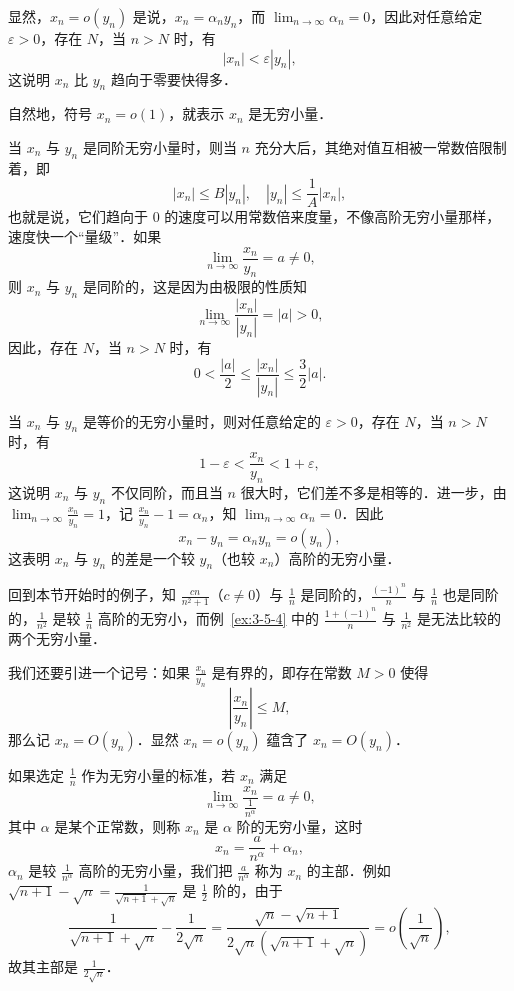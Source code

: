 显然，$x_n = o(y_n)$ 是说，$x_n = \alpha_n y_n$，而 $\lim_{n \to \infty} \alpha_n = 0$，因此对任意给定 $\varepsilon > 0$，存在 $N$，当 $n > N$ 时，有
\[
|x_n| < \varepsilon |y_n|,
\]
这说明 $x_n$ 比 $y_n$ 趋向于零要快得多．

自然地，符号 $x_n = o(1)$，就表示 $x_n$ 是无穷小量．

当 $x_n$ 与 $y_n$ 是同阶无穷小量时，则当 $n$ 充分大后，其绝对值互相被一常数倍限制着，即
\[
|x_n| \leqslant B|y_n|, \quad |y_n| \leqslant \frac{1}{A}|x_n|,
\]
也就是说，它们趋向于 $0$ 的速度可以用常数倍来度量，不像高阶无穷小量那样，速度快一个``量级''．如果
\[
\lim_{n \to \infty} \frac{x_n}{y_n} = a \neq 0,
\]
则 $x_n$ 与 $y_n$ 是同阶的，这是因为由极限的性质知
\[
\lim_{n \to \infty} \frac{|x_n|}{|y_n|} = |a| > 0,
\]
因此，存在 $N$，当 $n > N$ 时，有
\[
0 < \frac{|a|}{2} \leqslant \frac{|x_n|}{|y_n|} \leqslant \frac{3}{2}|a|.
\]

当 $x_n$ 与 $y_n$ 是等价的无穷小量时，则对任意给定的 $\varepsilon > 0$，存在 $N$，当 $n > N$ 时，有
\[
1 - \varepsilon < \frac{x_n}{y_n} < 1 + \varepsilon,
\]
这说明 $x_n$ 与 $y_n$ 不仅同阶，而且当 $n$ 很大时，它们差不多是相等的．进一步，由 $\lim_{n \to \infty} \frac{x_n}{y_n} = 1$，记 $\frac{x_n}{y_n} - 1 = \alpha_n$，知 $\lim_{n \to \infty} \alpha_n = 0$．因此
\[
x_n - y_n = \alpha_n y_n = o(y_n),
\]
这表明 $x_n$ 与 $y_n$ 的差是一个较 $y_n$（也较 $x_n$）高阶的无穷小量．

回到本节开始时的例子，知 $\frac{cn}{n^2+1}$（$c \neq 0$）与 $\frac{1}{n}$ 是同阶的，$\frac{(-1)^n}{n}$ 与 $\frac{1}{n}$ 也是同阶的，$\frac{1}{n^2}$ 是较 $\frac{1}{n}$ 高阶的无穷小，而例~\ref{ex:3-5-4} 中的 $\frac{1+(-1)^n}{n}$ 与 $\frac{1}{n^2}$ 是无法比较的两个无穷小量．

我们还要引进一个记号：如果 $\frac{x_n}{y_n}$ 是有界的，即存在常数 $M > 0$ 使得
\[
\left|\frac{x_n}{y_n}\right| \leqslant M,
\]
那么记 $x_n = O(y_n)$．显然 $x_n = o(y_n)$ 蕴含了 $x_n = O(y_n)$．

如果选定 $\frac{1}{n}$ 作为无穷小量的标准，若 $x_n$ 满足
\[
\lim_{n \to \infty} \frac{x_n}{\frac{1}{n^\alpha}} = a \neq 0,
\]
其中 $\alpha$ 是某个正常数，则称 $x_n$ 是 $\alpha$ 阶的无穷小量，这时
\[
x_n = \frac{a}{n^\alpha} + \alpha_n,
\]
$\alpha_n$ 是较 $\frac{1}{n^\alpha}$ 高阶的无穷小量，我们把 $\frac{a}{n^\alpha}$ 称为 $x_n$ 的主部．例如 $\sqrt{n+1} - \sqrt{n} = \frac{1}{\sqrt{n+1} + \sqrt{n}}$ 是 $\frac{1}{2}$ 阶的，由于
\[
\frac{1}{\sqrt{n+1} + \sqrt{n}} - \frac{1}{2\sqrt{n}} = \frac{\sqrt{n} - \sqrt{n+1}}{2\sqrt{n}(\sqrt{n+1} + \sqrt{n})} = o\left(\frac{1}{\sqrt{n}}\right),
\]
故其主部是 $\frac{1}{2\sqrt{n}}$．

